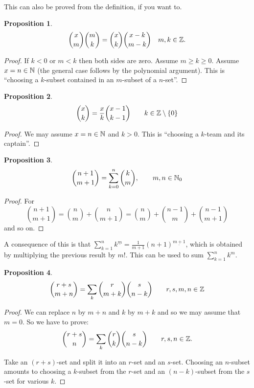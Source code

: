 \documentclass{notes}
\theoremstyle{plain}
\newtheorem*{proposition}{Proposition}
\begin{document}
This can also be proved from the definition, if you want to.

\begin{proposition}
\[
\binom{x}{m} \binom{m}{k} = \binom{x}{k} \binom{x-k}{m-k} \quad m,k \in \mathbb{Z}.
\]
\end{proposition}

\begin{proof}
If $k < 0$ or $m < k$ then both sides are zero.  Assume $m \ge k \ge 0$.
Assume $x = n \in \mathbb{N}$ (the general case follows by the polynomial argument).
This is ``choosing a $k$-subset contained in an $m$-subset of a $n$-set''.
\end{proof}

\begin{proposition}
\[
\binom{x}{k} = \frac{x}{k} \binom{x-1}{k-1} \qquad k \in \mathbb{Z} \setminus
\{ 0 \}
\]
\end{proposition}

\begin{proof}
We may assume $x = n \in \mathbb{N}$ and $k > 0$.  This is ``choosing a $k$-team
and its captain''.
\end{proof}

\begin{proposition}
\[
\binom{n+1}{m+1} = \sum_{k=0}^n \binom{k}{m}, \qquad m,n \in \mathbb{N}_0
\]
\end{proposition}

\begin{proof}
For
\[
\binom{n+1}{m+1} = \binom{n}{m} + \binom{n}{m+1}
= \binom{n}{m} + \binom{n-1}{m} + \binom{n-1}{m+1}
\]
and so on.
\end{proof}

A consequence of this is that $\sum_{k=1}^n k^{\underline{m}}
= \frac{1}{m+1} (n+1)^{\underline{m+1}}$, which is obtained by multiplying
the previous result by $m!$.  This can be used to sum $\sum_{k=1}^n k^m$.

\begin{proposition}
\[
\binom{r+s}{m+n} = \sum_k \binom{r}{m+k} \binom{s}{n-k} \qquad r,s,m,n \in \mathbb{Z}
\]
\end{proposition}

\begin{proof}
We can replace $n$ by $m+n$ and $k$ by $m+k$ and so we may assume that
$m=0$.  So we have to prove:
\[
\binom{r+s}{n} = \sum_k \binom{r}{k} \binom{s}{n-k} \qquad r,s,n \in \mathbb{Z}.
\]

Take an $(r+s)$-set and split it into an $r$-set and an $s$-set.  Choosing
an $n$-subset amounts to choosing a $k$-subset from the $r$-set and an
$(n-k)$-subset from the $s$-set for various $k$.
\end{proof}
\end{document}
